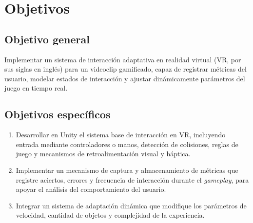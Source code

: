 \chapter{Objetivos}

\section{Objetivo general}
\label{sec:objetivoGeneral}
Implementar un sistema de interacción adaptativa en realidad virtual (VR, 
por sus siglas en inglés) para un videoclip gamificado, capaz de registrar 
métricas del usuario, modelar estados de interacción y ajustar dinámicamente
parámetros del juego en tiempo real.

\section{Objetivos específicos}
\label{sec:objetivosEspecificos}
\begin{enumerate}
    \item Desarrollar en Unity el sistema base de interacción en VR, 
    incluyendo entrada mediante controladores o manos, detección de 
    colisiones, reglas de juego y mecanismos de retroalimentación visual y 
    háptica.

    \item Implementar un mecanismo de captura y almacenamiento de métricas 
    que registre aciertos, errores y frecuencia de interacción durante el
    \textit{gameplay}, para apoyar el análisis del comportamiento del usuario.

    \item Integrar un sistema de adaptación dinámica que modifique los 
    parámetros de velocidad, cantidad de objetos y complejidad de la 
    experiencia.
\end{enumerate}